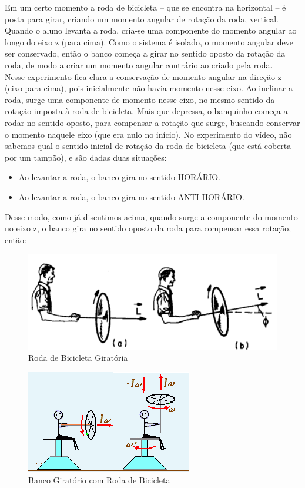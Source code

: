 Em um certo momento a roda de bicicleta – que se encontra na horizontal – é posta para girar, criando um momento angular de rotação da roda, vertical. Quando o aluno levanta a roda, cria-se uma componente do momento angular ao longo do eixo z (para cima). Como o sistema é isolado, o momento angular deve ser conservado, então o banco começa a girar no sentido oposto da rotação da roda, de modo a criar um momento angular contrário ao criado pela roda.\\

Nesse experimento fica clara a conservação de momento angular na direção z (eixo para cima), pois inicialmente não havia momento nesse eixo. Ao inclinar a roda, surge uma componente de momento nesse eixo, no mesmo sentido da rotação imposta à roda de bicicleta. Mais que depressa, o banquinho começa a rodar no sentido oposto, para compensar a rotação que surge, buscando conservar o momento naquele eixo (que era nulo no início). No experimento do vídeo, não sabemos qual o sentido inicial de rotação da roda de bicicleta (que está coberta por um tampão), e são dadas duas situações:

\begin{itemize}
    \item Ao levantar a roda, o banco gira no sentido HORÁRIO.
    \item Ao levantar a roda, o banco gira no sentido ANTI-HORÁRIO.
\end{itemize}

Desse modo, como já discutimos acima, quando surge a componente do momento no eixo z, o banco gira no sentido oposto da roda para compensar essa rotação, então:

\begin{figure}[H]
  \centering
  \includegraphics[scale=1.4]{images/i5.png}
  \caption{Roda de Bicicleta Giratória}
\end{figure}

\begin{figure}[H]
  \centering
  \includegraphics[scale=1.7]{images/i6.png}
  \caption{Banco Giratório com Roda de Bicicleta}
\end{figure}

